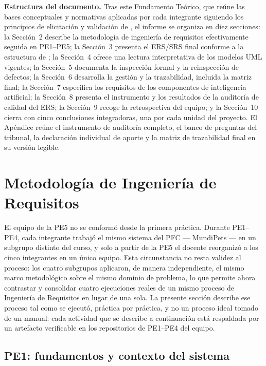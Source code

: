 \documentclass[journal,onecolumn]{IEEEtran}
\begin{document}
	\textbf{Estructura del documento.} Tras este Fundamento Teórico, que reúne las
	bases conceptuales y normativas aplicadas por cada integrante siguiendo los
	principios de elicitación y validación de \cite{pohl2025}, el informe se organiza
	en diez secciones: la Sección~2 describe la metodología de ingeniería de
	requisitos efectivamente seguida en PE1--PE5; la Sección~3 presenta el ERS/SRS
	final conforme a la estructura de \cite{ieee29148}; la Sección~4 ofrece una
	lectura interpretativa de los modelos UML vigentes; la Sección~5 documenta la
	inspección formal y la reinspección de defectos; la Sección~6 desarrolla la
	gestión y la trazabilidad, incluida la matriz final; la Sección~7 especifica los
	requisitos de los componentes de inteligencia artificial; la Sección~8 presenta
	el instrumento y los resultados de la auditoría de calidad del ERS; la
	Sección~9 recoge la retrospectiva del equipo; y la Sección~10 cierra con cinco
	conclusiones integradoras, una por cada unidad del proyecto. El Apéndice reúne el
	instrumento de auditoría completo, el banco de preguntas del tribunal, la
	declaración individual de aporte y la matriz de trazabilidad final en su versión
	legible.
	\newpage
	
	\section{Metodología de Ingeniería de Requisitos}
	\label{sec:metodologia}
	
	El equipo de la PE5 no se conformó desde la primera práctica. Durante PE1--PE4, cada
	integrante trabajó el mismo sistema del PFC --- MundiPets --- en un subgrupo distinto del
	curso, y solo a partir de la PE5 el docente reorganizó a los cinco integrantes en un único
	equipo. Esta circunstancia no resta validez al proceso: los cuatro subgrupos aplicaron, de
	manera independiente, el mismo marco
	metodológico sobre el mismo dominio de problema, lo que permite ahora contrastar y
	consolidar cuatro ejecuciones reales de un mismo proceso de Ingeniería de Requisitos en
	lugar de una sola. La presente sección describe ese proceso tal como se ejecutó,
	práctica por práctica, y no un proceso ideal tomado de un manual: cada actividad que se
	describe a continuación está respaldada por un artefacto verificable en los repositorios
	de PE1--PE4 del equipo.
	
	\subsection{PE1: fundamentos y contexto del sistema}
	
\end{document}
